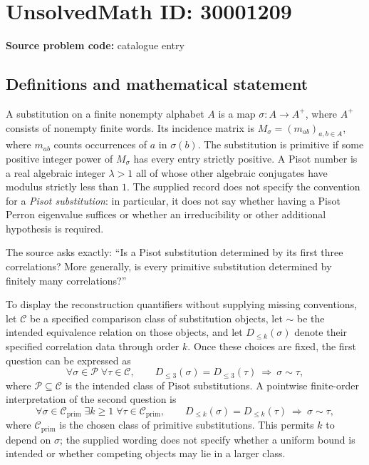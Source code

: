 \documentclass[11pt]{article}
\begin{document}
\section*{UnsolvedMath ID: 30001209}
\textbf{Source problem code:} catalogue entry
\subsection{Definitions and mathematical statement}
A substitution on a finite nonempty alphabet \(A\) is a map \(\sigma:A\to A^{+}\), where \(A^{+}\) consists of nonempty finite words. Its incidence matrix is \(M_\sigma=(m_{ab})_{a,b\in A}\), where \(m_{ab}\) counts occurrences of \(a\) in \(\sigma(b)\). The substitution is primitive if some positive integer power of \(M_\sigma\) has every entry strictly positive. A Pisot number is a real algebraic integer \(\lambda>1\) all of whose other algebraic conjugates have modulus strictly less than \(1\). The supplied record does not specify the convention for a \emph{Pisot substitution}: in particular, it does not say whether having a Pisot Perron eigenvalue suffices or whether an irreducibility or other additional hypothesis is required.

The source asks exactly: ``Is a Pisot substitution determined by its first three correlations? More generally, is every primitive substitution determined by finitely many correlations?''

To display the reconstruction quantifiers without supplying missing conventions, let \(\mathcal C\) be a specified comparison class of substitution objects, let \(\sim\) be the intended equivalence relation on those objects, and let \(D_{\leq k}(\sigma)\) denote their specified correlation data through order \(k\). Once these choices are fixed, the first question can be expressed as
\[
\forall\sigma\in\mathcal P\;\forall\tau\in\mathcal C,\qquad
D_{\leq3}(\sigma)=D_{\leq3}(\tau)
\ \Longrightarrow\ \sigma\sim\tau,
\]
where \(\mathcal P\subseteq\mathcal C\) is the intended class of Pisot substitutions. A pointwise finite-order interpretation of the second question is
\[
\forall\sigma\in\mathcal C_{\mathrm{prim}}\;\exists k\geq1\;\forall\tau\in\mathcal C_{\mathrm{prim}},\qquad
D_{\leq k}(\sigma)=D_{\leq k}(\tau)
\ \Longrightarrow\ \sigma\sim\tau,
\]
where \(\mathcal C_{\mathrm{prim}}\) is the chosen class of primitive substitutions. This permits \(k\) to depend on \(\sigma\); the supplied wording does not specify whether a uniform bound is intended or whether competing objects may lie in a larger class.
\end{document}
